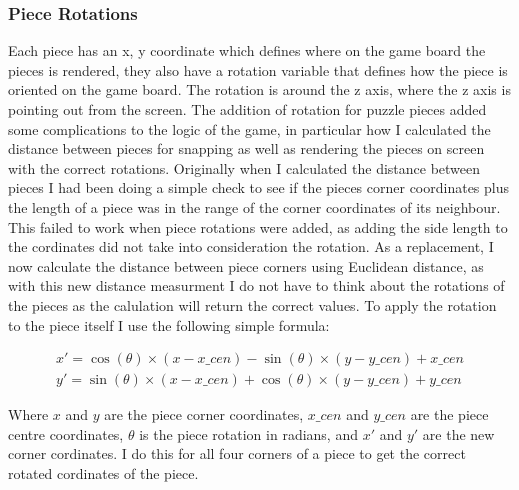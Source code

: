 \documentclass{article}
\begin{document}
\subsubsection{Piece Rotations}
Each piece has an x, y coordinate which defines where on the game board the
pieces is rendered, they also have a rotation variable that defines how the
piece is oriented on the game board. The rotation is around the z axis, where
the z axis is pointing out from the screen. The addition of rotation for puzzle
pieces added some complications to the logic of the game, in particular how I
calculated the distance between pieces for snapping as well as rendering the
pieces on screen with the correct rotations. Originally when I calculated the
distance between pieces I had been doing a simple check to see if the pieces
corner coordinates plus the length of a piece was in the range of the corner
coordinates of its neighbour. This failed to work when piece rotations were
added, as adding the side length to the cordinates did not take into
consideration the rotation. As a replacement, I now calculate the distance
between piece corners using Euclidean distance, as with this new distance
measurment I do not have to think about the rotations of the pieces as the
calulation will return the correct values. To apply the rotation to the piece
itself I use the following simple formula:

\begin{equation*}
\begin{aligned}
x' = \cos(\theta) \times (x - x\_cen) - \sin(\theta) \times (y - y\_cen) + x\_cen\\ 
y' = \sin(\theta) \times (x - x\_cen) + \cos(\theta) \times (y - y\_cen) + y\_cen
\end{aligned}
\end{equation*}

Where $x$ and $y$ are the piece corner coordinates, $x\_cen$ and $y\_cen$ are
the piece centre coordinates, $\theta$ is the piece rotation in radians, and
$x'$ and $y'$ are the new corner cordinates. I do this for all four corners of a
piece to get the correct rotated cordinates of the piece.

\end{document}
